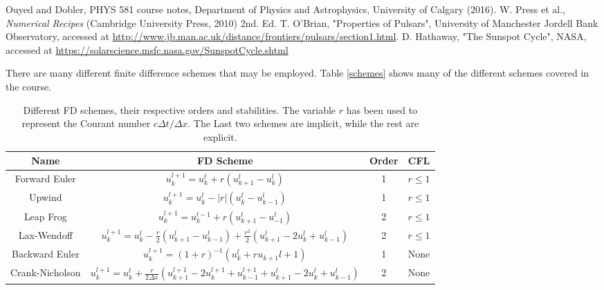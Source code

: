 \documentclass[twocolumn]{article}
\begin{document}
\begin{thebibliography}{00}
	Ouyed and Dobler, PHYS 581 course notes, Department of Physics and Astrophysics, University of Calgary (2016).
	W. Press et al., \emph{Numerical Recipes} (Cambridge University Press, 2010) 2nd. Ed.
	T. O'Brian, "Properties of Pulsars", University of Manchester Jordell Bank Observatory, accessed at \url{http://www.jb.man.ac.uk/distance/frontiers/pulsars/section1.html}.
	D. Hathaway, "The Sunspot Cycle",  NASA, accessed at \url{ https://solarscience.msfc.nasa.gov/SunspotCycle.shtml}
\end{thebibliography}

There are many different finite difference schemes that may be employed. Table \ref{schemes} shows many of the different schemes covered in the course. 

\begin{table}
	\begin{center}
		\begin{tabular}{|c|c|c|c|}
			\hline
			Name & FD Scheme & Order & CFL \\
			\hline
			Forward Euler & $u_{k}^{l+1} = u_k^l +r(u_{k+1}^l - u_k^l) $ & 1 & $r\leq 1$ \\
			\hline
			Upwind & $ u_{k}^{l+1} = u_k^l -|r|(u_k^l - u_{k-1}^l) $ & 1 & $r\leq 1$ \\
			\hline
			Leap Frog & $u_{k}^{l+1} = u_k^{l-1} +r(u_{k+1}^l - u_{-1}^l) $ & 2 & $r\leq 1$ \\
			\hline
			Lax-Wendoff & $u_{k}^{l+1} = u_k^l - \frac{r}{2}(u_{k+1}^l - u_{k-1}^l) + \frac{r^2}{2}(u_{k+1}^l - 2u_k^l + u_{k-1}^l) $ & 2 & $r\leq 1$ \\
			\hline
			Backward Euler & $u_{k}^{l+1} = (1 + r)^{-1}(u_k^l + ru_{k+1}{l+1}) $ & 1 &  None\\
			\hline
			Crank-Nicholson & $u_{k}^{l+1} = u_k^l +\frac{r}{2 \Delta x}(u_{k+1}^{l+1} - 2u_k^{l+1} +u_{k-1}^{l+1} + u_{k+1}^l -2u_k^l + u_{k-1}^l) $ & 2 & None \\
			\hline
		\end{tabular}
		\label{Schemes}
		\caption{Different FD schemes, their respective orders and stabilities. The variable $r$ has been used to represent the Courant number $c\Delta t / \Delta x$. The Last two schemes are implicit, while the rest are explicit.}
	\end{center}
\end{table}
\end{document}
